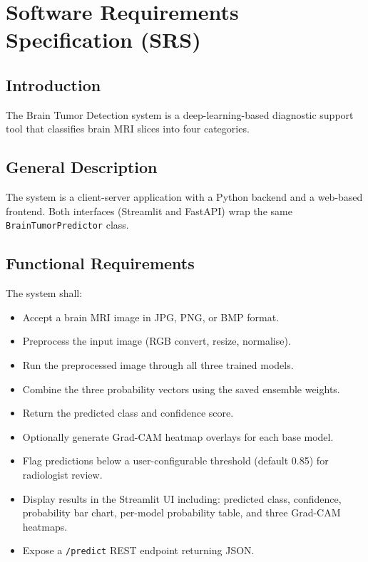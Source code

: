 \documentclass[12pt,a4paper,oneside]{report}
\begin{document}
\section{Software Requirements Specification (SRS)}

\subsection{Introduction}

The Brain Tumor Detection system is a deep-learning-based diagnostic support tool that classifies brain MRI slices into four categories.

\subsection{General Description}

The system is a client-server application with a Python backend and a web-based frontend. Both interfaces (Streamlit and FastAPI) wrap the same \texttt{BrainTumorPredictor} class.

\subsection{Functional Requirements}

The system shall:

\begin{itemize}[leftmargin=*]
  \item Accept a brain MRI image in JPG, PNG, or BMP format.
  \item Preprocess the input image (RGB convert, resize, normalise).
  \item Run the preprocessed image through all three trained models.
  \item Combine the three probability vectors using the saved ensemble weights.
  \item Return the predicted class and confidence score.
  \item Optionally generate Grad-CAM heatmap overlays for each base model.
  \item Flag predictions below a user-configurable threshold (default 0.85) for radiologist review.
  \item Display results in the Streamlit UI including: predicted class, confidence, probability bar chart, per-model probability table, and three Grad-CAM heatmaps.
  \item Expose a \texttt{/predict} REST endpoint returning JSON.
\end{itemize}
\end{document}
